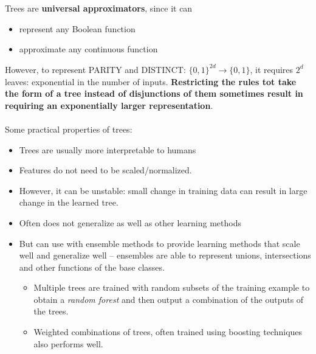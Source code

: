 \documentclass{article}
\begin{document}
   \\\\
   Trees are \textbf{universal approximators}, since it can 
   \begin{itemize}
   \item represent any Boolean function
   \item approximate any continuous function
   \end{itemize}
   However, to represent PARITY and DISTINCT: $\{0,1\}^{2d} \rightarrow \{0,1\}$, it requires $2^d$ leaves: exponential in the number of inputs. \textbf{Restricting the rules tot take the form of a tree instead of disjunctions of them sometimes result in requiring an exponentially larger representation}.
   \\\\
   Some practical properties of trees:
   \begin{itemize}
   \item Trees are usually more interpretable to humans
   \item Features do not need to be scaled/normalized.
   \item However, it can be unstable: small change in training data can result in large change in the learned tree.
   \item Often does not generalize as well as other learning methods
   \item But can use with ensemble methods to provide learning methods that scale well and generalize well -- ensembles are able to represent unions, intersections and other functions of the base classes.
   \begin{itemize}
   \item Multiple trees are trained with random subsets of the training example to obtain a \textit{random forest} and then output a combination of the outputs of the trees.
   \item Weighted combinations of trees, often trained using boosting techniques also performs well.
   \end{itemize}
   \end{itemize}
   
\end{document}
